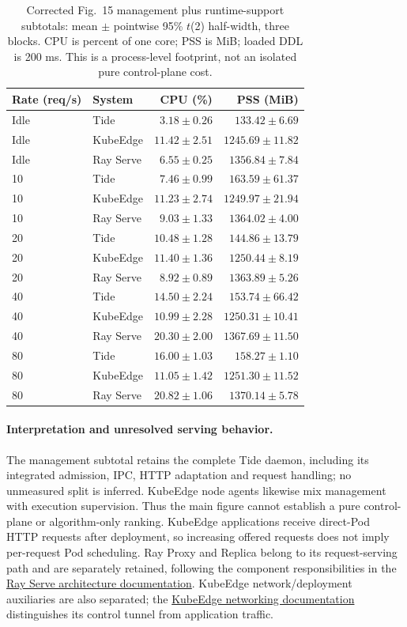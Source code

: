 \begin{table}[htbp]\centering\small
\caption{Corrected Fig.~15 management plus runtime-support subtotals: mean $\pm$ pointwise 95\% $t$(2) half-width, three blocks. CPU is percent of one core; PSS is MiB; loaded DDL is 200 ms. This is a process-level footprint, not an isolated pure control-plane cost.}
\label{tab:fig14-regular}
\setlength{\tabcolsep}{3pt}
\begin{tabular*}{\linewidth}{@{\extracolsep{\fill}}llrr}
\toprule Rate (req/s) & System & CPU (\%) & PSS (MiB)\\\midrule
Idle & Tide & $3.18 \pm 0.26$ & $133.42 \pm 6.69$\\
Idle & KubeEdge & $11.42 \pm 2.51$ & $1245.69 \pm 11.82$\\
Idle & Ray Serve & $6.55 \pm 0.25$ & $1356.84 \pm 7.84$\\
10 & Tide & $7.46 \pm 0.99$ & $163.59 \pm 61.37$\\
10 & KubeEdge & $11.23 \pm 2.74$ & $1249.97 \pm 21.94$\\
10 & Ray Serve & $9.03 \pm 1.33$ & $1364.02 \pm 4.00$\\
20 & Tide & $10.48 \pm 1.28$ & $144.86 \pm 13.79$\\
20 & KubeEdge & $11.40 \pm 1.36$ & $1250.44 \pm 8.19$\\
20 & Ray Serve & $8.92 \pm 0.89$ & $1363.89 \pm 5.26$\\
40 & Tide & $14.50 \pm 2.24$ & $153.74 \pm 66.42$\\
40 & KubeEdge & $10.99 \pm 2.28$ & $1250.31 \pm 10.41$\\
40 & Ray Serve & $20.30 \pm 2.00$ & $1367.69 \pm 11.50$\\
80 & Tide & $16.00 \pm 1.03$ & $158.27 \pm 1.10$\\
80 & KubeEdge & $11.05 \pm 1.42$ & $1251.30 \pm 11.52$\\
80 & Ray Serve & $20.82 \pm 1.06$ & $1370.14 \pm 5.78$\\
\bottomrule\end{tabular*}\end{table}

\paragraph{Interpretation and unresolved serving behavior.}
The management subtotal retains the complete Tide daemon, including its integrated admission, IPC, HTTP adaptation and request handling; no unmeasured split is inferred. KubeEdge node agents likewise mix management with execution supervision. Thus the main figure cannot establish a pure control-plane or algorithm-only ranking. KubeEdge applications receive direct-Pod HTTP requests after deployment, so increasing offered requests does not imply per-request Pod scheduling. Ray Proxy and Replica belong to its request-serving path and are separately retained, following the component responsibilities in the \href{https://docs.ray.io/en/latest/serve/architecture.html}{Ray Serve architecture documentation}. KubeEdge network/deployment auxiliaries are also separated; the \href{https://kubeedge.io/docs/advanced/cni-edge-networking/}{KubeEdge networking documentation} distinguishes its control tunnel from application traffic.

